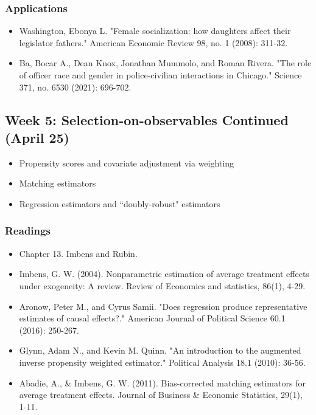 \documentclass[11pt, article, oneside]{memoir}
\theoremstyle{Assumption}
\begin{document}
\subsubsection*{Applications}

\begin{itemize}
\item Washington, Ebonya L. "Female socialization: how daughters affect their legislator fathers." American Economic Review 98, no. 1 (2008): 311-32.
\item Ba, Bocar A., Dean Knox, Jonathan Mummolo, and Roman Rivera. "The role of officer race and gender in police-civilian interactions in Chicago." Science 371, no. 6530 (2021): 696-702.
\end{itemize}

\subsection{Week 5: Selection-on-observables Continued (April 25)}

\begin{itemize}
\item Propensity scores and covariate adjustment via weighting 
\item Matching estimators
\item Regression estimators and ``doubly-robust" estimators
\end{itemize}


\subsubsection*{Readings}

\begin{itemize}
\item Chapter 13. Imbens and Rubin. 
\item Imbens, G. W. (2004). Nonparametric estimation of average treatment effects under exogeneity: A review. Review of Economics and statistics, 86(1), 4-29.
\item Aronow, Peter M., and Cyrus Samii. "Does regression produce representative estimates of causal effects?." American Journal of Political Science 60.1 (2016): 250-267.
\item Glynn, Adam N., and Kevin M. Quinn. "An introduction to the augmented inverse propensity weighted estimator." Political Analysis 18.1 (2010): 36-56.
\item Abadie, A., \& Imbens, G. W. (2011). Bias-corrected matching estimators for average treatment effects. Journal of Business \& Economic Statistics, 29(1), 1-11.
\end{itemize}
\end{document}
